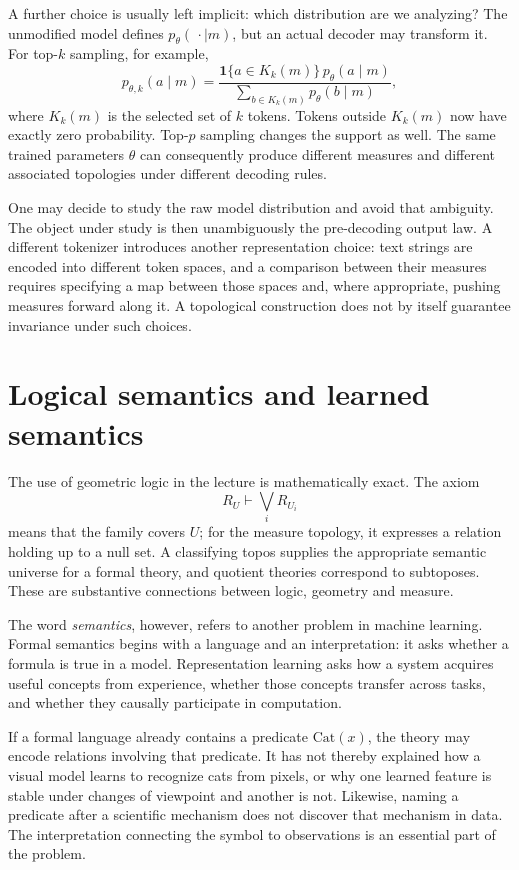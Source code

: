 A further choice is usually left implicit: which distribution are we analyzing? The unmodified model defines \(p_\theta(\,\cdot\mid m)\), but an actual decoder may transform it. For top-\(k\) sampling, for example,
\[
 p_{\theta,k}(a\mid m)
 =\frac{\mathbf1\{a\in K_k(m)\}\,p_\theta(a\mid m)}
 {\sum_{b\in K_k(m)}p_\theta(b\mid m)},
\]
where \(K_k(m)\) is the selected set of \(k\) tokens. Tokens outside \(K_k(m)\) now have exactly zero probability. Top-\(p\) sampling changes the support as well. The same trained parameters \(\theta\) can consequently produce different measures and different associated topologies under different decoding rules.

One may decide to study the raw model distribution and avoid that ambiguity. The object under study is then unambiguously the pre-decoding output law. A different tokenizer introduces another representation choice: text strings are encoded into different token spaces, and a comparison between their measures requires specifying a map between those spaces and, where appropriate, pushing measures forward along it. A topological construction does not by itself guarantee invariance under such choices.

\section{Logical semantics and learned semantics}

The use of geometric logic in the lecture is mathematically exact. The axiom
\[
 R_U\vdash\bigvee_iR_{U_i}
\]
means that the family covers \(U\); for the measure topology, it expresses a relation holding up to a null set. A classifying topos supplies the appropriate semantic universe for a formal theory, and quotient theories correspond to subtoposes. These are substantive connections between logic, geometry and measure.

The word \emph{semantics}, however, refers to another problem in machine learning. Formal semantics begins with a language and an interpretation: it asks whether a formula is true in a model. Representation learning asks how a system acquires useful concepts from experience, whether those concepts transfer across tasks, and whether they causally participate in computation.

If a formal language already contains a predicate \(\mathrm{Cat}(x)\), the theory may encode relations involving that predicate. It has not thereby explained how a visual model learns to recognize cats from pixels, or why one learned feature is stable under changes of viewpoint and another is not. Likewise, naming a predicate after a scientific mechanism does not discover that mechanism in data. The interpretation connecting the symbol to observations is an essential part of the problem.

